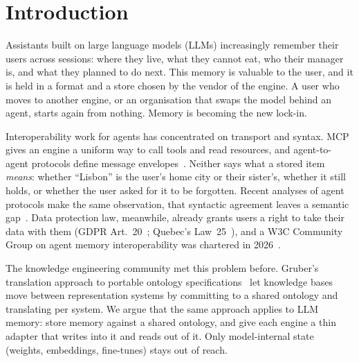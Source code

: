 \section{Introduction}\label{sec:intro}

Assistants built on large language models (LLMs) increasingly remember their users across
sessions: where they live, what they cannot eat, who their manager is, and what they planned to
do next. This memory is valuable to the user, and it is held in a format and a store chosen by
the vendor of the engine. A user who moves to another engine, or an organisation that swaps the
model behind an agent, starts again from nothing. Memory is becoming the new lock-in.

Interoperability work for agents has concentrated on transport and syntax. MCP~\cite{mcp} gives
an engine a uniform way to call tools and read resources, and agent-to-agent protocols define
message envelopes~\cite{ehtesham2025survey}. Neither says what a stored item \emph{means}: whether
``Lisbon'' is the user's home city or their sister's, whether it still holds, or whether the user
asked for it to be forgotten. Recent analyses of agent protocols make the same observation, that
syntactic agreement leaves a semantic gap~\cite{beyondmessage2026}. Data protection law, meanwhile,
already grants users a right to take their data with them (GDPR Art.~20~\cite{gdpr}; Quebec's
Law~25~\cite{quebec25}), and a W3C Community Group on agent memory interoperability was chartered
in 2026~\cite{w3cmemcg2026}.

The knowledge engineering community met this problem before. Gruber's translation approach to
portable ontology specifications~\cite{gruber1993} let knowledge bases move between
representation systems by committing to a shared ontology and translating per system. We argue
that the same approach applies to LLM memory: store memory against a shared ontology, and give
each engine a thin adapter that writes into it and reads out of it. Only model-internal state
(weights, embeddings, fine-tunes) stays out of reach.

